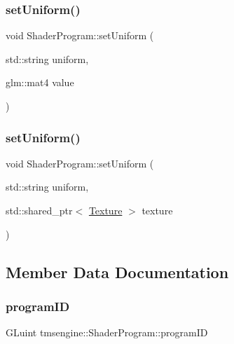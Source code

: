 \subsubsection{\texorpdfstring{set\+Uniform()}{setUniform()}\hspace{0.1cm}{\footnotesize\ttfamily [3/4]}}
{\footnotesize\ttfamily void Shader\+Program\+::set\+Uniform (\begin{DoxyParamCaption}\item[{std\+::string}]{uniform,  }\item[{glm\+::mat4}]{value }\end{DoxyParamCaption})}

\mbox{\label{classtmsengine_1_1_shader_program_a048ea3e952f3a2480f20d2b521b56743}} 
\subsubsection{\texorpdfstring{set\+Uniform()}{setUniform()}\hspace{0.1cm}{\footnotesize\ttfamily [4/4]}}
{\footnotesize\ttfamily void Shader\+Program\+::set\+Uniform (\begin{DoxyParamCaption}\item[{std\+::string}]{uniform,  }\item[{std\+::shared\+\_\+ptr$<$ \hyperlink{classtmsengine_1_1_texture}{Texture} $>$}]{texture }\end{DoxyParamCaption})}



\subsection{Member Data Documentation}
\mbox{\label{classtmsengine_1_1_shader_program_a23f13b0cc16d56fd9d1423e06442d67c}} 
\subsubsection{\texorpdfstring{program\+ID}{programID}}
{\footnotesize\ttfamily G\+Luint tmsengine\+::\+Shader\+Program\+::program\+ID\hspace{0.3cm}{\ttfamily [private]}}

